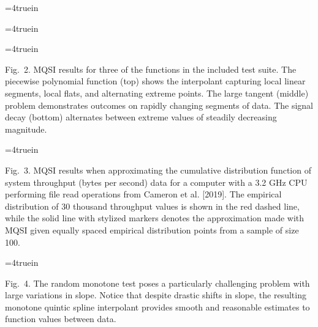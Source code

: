 
\topinsert
\textBlack
\centerline{\epsfxsize=4truein }
\centerline{\epsfxsize=4truein }
\centerline{\epsfxsize=4truein }
{\narrower\noindent\rmVIII Fig.\ 2.
{\ttVIII MQSI} results for three of the functions in the included test
suite. The {\itVIII piecewise polynomial} function (top) shows the
interpolant capturing local linear segments, local flats, and
alternating extreme points. The {\itVIII large tangent} (middle)
problem demonstrates outcomes on rapidly changing segments of data.
The {\itVIII signal decay} (bottom) alternates between extreme values
of steadily decreasing magnitude.
\par}
\vskip 6mm
\centerline{\epsfxsize=4truein }
{\narrower\noindent\rmVIII Fig.\ 3.
{\ttVIII MQSI} results when approximating the cumulative distribution
function of system throughput (bytes per second) data for a computer
with a 3.2 GHz CPU performing file read operations from Cameron et al.
[2019]. The empirical distribution of 30 thousand throughput values is
shown in the red dashed line, while the solid line with stylized
markers denotes the approximation made with {\ttVIII MQSI} given
equally spaced empirical distribution points from a sample of size 100.
\par}
\endinsert

\topinsert
\centerline{\epsfxsize=4truein }
{\narrower\noindent\rmVIII  Fig.\ 4.
The {\itVIII random monotone} test poses a particularly challenging
problem with large variations in slope. Notice that despite drastic
shifts in slope, the resulting monotone quintic spline interpolant
provides smooth and reasonable estimates to function values between data.
\par}
\iffalse %
\vskip 15mm
\centerline{\epsfxsize=4truein \epsffile{vis/7-runtimes-10.eps}}
\centerline{\epsfxsize=4truein \epsffile{vis/8-runtimes-100.eps}}
{\everymath={\scriptstyle} \narrower\noindent\rmVIII Fig.\ 5.
Median total runtime of the routine {\ttVIII MQSI} for number of data points
$n=10$
to 100 (top) and $n=100$ to 1000 (bottom), generated from 100
repeated trials averaged over $14$ different testing functions. The
timings are colored by major algorithmic component, but the vast
majority of execution time is spent solving the banded linear system
of equations in the {\ttVIII FIT\_SPLINE} routine. The runtimes for
the quadratic facet (Algorithm 1) take roughly one microsecond
($10^{-6}$ seconds) per breakpoint, while the binary search
(Algorithm 4) takes roughly four microseconds per breakpoint.
\par}
\fi %
\endinsert

